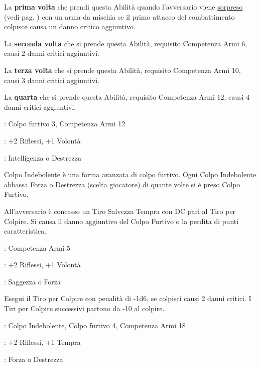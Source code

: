 \begin{multicols}{2}
La \textbf{prima volta} che prendi questa Abilità quando l'avversario viene \hyperlink{sorpresa}{sorpreso} (vedi pag. \pageref{coltidisorpresa}) con un arma da mischia se il primo attacco del combattimento colpisce causa un danno critico aggiuntivo.

La \textbf{seconda volta} che si prende questa Abilità, requisito Competenza Armi 6, causi 2 danni critici aggiuntivi.

La \textbf{terza volta} che si prende questa Abilità, requisito Competenza Armi 10, causi 3 danni critici aggiuntivi.

La \textbf{quarta} che si prende questa Abilità, requisito Competenza Armi 12, causi 4 danni critici aggiuntivi.


\begin{description}[noitemsep, topsep=0pt, parsep=0pt, partopsep=0pt, leftmargin=0cm, labelwidth=2.5cm]
    \item[\textbf{Requisito}]: Colpo furtivo 3, Competenza Armi 12
    \item[\textbf{Tiri Salvezza}]: +2 Riflessi, +1 Volontà
    \item[\textbf{Caratteristica}]: Intelligenza o Destrezza
\end{description}

Colpo Indebolente è una forma avanzata di colpo furtivo. Ogni Colpo Indebolente abbassa Forza o Destrezza (scelta giocatore) di quante volte si è preso Colpo Furtivo.

All'avversario è concesso un Tiro Salvezza Tempra con DC pari al Tiro per Colpire. Si causa il danno aggiuntivo del Colpo Furtivo o la perdita di punti caratteristica.

\begin{description}[noitemsep, topsep=0pt, parsep=0pt, partopsep=0pt, leftmargin=0cm, labelwidth=2.5cm]
    \item[\textbf{Requisito}]: Competenza Armi 5
    \item[\textbf{Tiri Salvezza}]: +2 Riflessi, +1 Volontà
    \item[\textbf{Caratteristica}]: Saggezza o Forza
\end{description}

Esegui il Tiro per Colpire con penalità di -1d6, se colpisci causi 2 danni critici. I Tiri per Colpire successivi partono da -10 al colpire.

\begin{description}[noitemsep, topsep=0pt, parsep=0pt, partopsep=0pt, leftmargin=0cm, labelwidth=2.5cm]
    \item[\textbf{Requisito}]: Colpo Indebolente, Colpo furtivo 4, Competenza Armi 18
    \item[\textbf{Tiri Salvezza}]: +2 Riflessi, +1 Tempra
    \item[\textbf{Caratteristica}]: Forza o Destrezza
\end{description}


\end{multicols}
